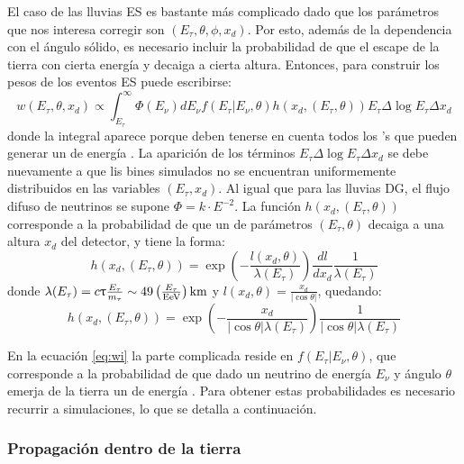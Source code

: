 		El caso de las lluvias ES es bastante más complicado dado que los parámetros que nos interesa corregir son $(E_\tau,\theta,\phi,x_d)$.
		Por esto, además de la dependencia con el ángulo sólido, es necesario incluir la probabilidad de que el \tauon{} escape de la tierra con cierta energía y decaiga a cierta altura.
		Entonces, para construir los pesos de los eventos ES puede escribirse:
		\begin{equation}
		 w(E_\tau,\theta,x_d) \propto \int_{E_\tau}^\infty \Phi(E_\nu)dE_\nu f(E_\tau|E_\nu,\theta) h(x_d,(E_\tau,\theta)) E_\tau \Delta\log E_\tau \Delta x_d
		 \label{eq:wi}
		\end{equation}
		donde la integral aparece porque deben tenerse en cuenta todos los \nutau{}'s que pueden generar un \tauon{} de energía \etau{}.
		La aparición de los términos $E_\tau \Delta\log E_\tau \Delta x_d$ se debe nuevamente a que lis bines simulados no se encuentran uniformemente distribuidos en las variables $(E_\tau,x_d)$.
		Al igual que para las lluvias DG, el flujo difuso de neutrinos se supone $\Phi=k\cdot E^{-2}$.
		La función $h(x_d,(E_\tau,\theta))$ corresponde a la probabilidad de que un \tauon{} de parámetros $(E_\tau,\theta)$ decaiga a una altura $x_d$ del detector, y tiene la forma:
		\begin{equation}
		 h(x_d,(E_\tau,\theta))=
		 \exp{\left(
		 -\frac{l(x_d,\theta)}{\lambda(E_\tau)}
		 \right)}
		 \frac{dl}{dx_d}\frac{1}{\lambda(E_\tau)}
		\end{equation}
		donde $\lambda(E_\tau)=c\uptau\frac{E_\tau}{m_\tau}\sim49\left(\frac{E_\tau}{\rm EeV}\right){\rm km}$ y $l(x_d,\theta)=\frac{x_d}{|\cos\theta|}$, quedando:
		\begin{equation}
		 h(x_d,(E_\tau,\theta))=
		 \exp{\left(
		 -\frac{x_d}{|\cos\theta|\lambda(E_\tau)}
		 \right)}
		 \frac{1}{|\cos\theta|\lambda(E_\tau)}
		 \label{eq:ptaudecay}
		\end{equation}
		
		En la ecuación \ref{eq:wi} la parte complicada reside en $f(E_\tau|E_\nu,\theta)$, que corresponde a la probabilidad de que dado un neutrino de energía $E_\nu$ y ángulo $\theta$ emerja de la tierra un \tauon{} de energía \etau{}.
		Para obtener estas probabilidades es necesario recurrir a simulaciones, lo que se detalla a continuación.
		
		\subsubsection{\label{sbsbsc:sim_prop_tierra}Propagaci\'on dentro de la tierra}
	
